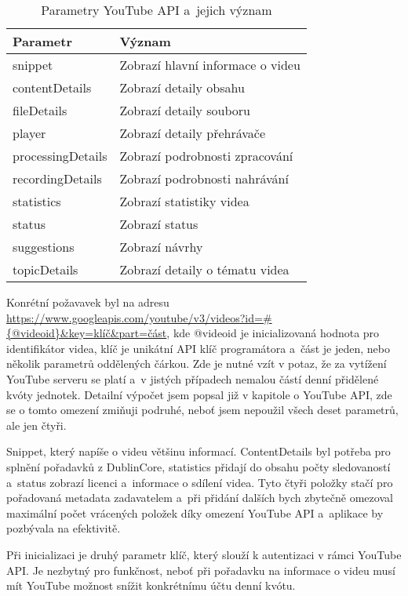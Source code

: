 \begin{table}[h!]
\centering
\begin{tabular}{| l | l |}
\hline
\textbf{Parametr} & \textbf{Význam} \\
\hline
snippet & Zobrazí hlavní informace o videu \\
\hline
contentDetails & Zobrazí detaily obsahu \\
\hline
fileDetails & Zobrazí detaily souboru \\
\hline
player & Zobrazí detaily přehrávače \\
\hline
processingDetails & Zobrazí podrobnosti zpracování \\
\hline
recordingDetails & Zobrazí podrobnosti nahrávání \\
\hline
statistics & Zobrazí statistiky videa \\
\hline
status & Zobrazí status \\
\hline
suggestions & Zobrazí návrhy \\
\hline
topicDetails & Zobrazí detaily o tématu videa \\
\hline
\end{tabular}
\caption[Parametry YouTube API a~jejich význam]{Parametry YouTube API a~jejich význam}\label{tab:apiparams}
\end{table}

\par Konrétní požavavek byl na adresu \url{https://www.googleapis.com/youtube/v3/videos?id=#{@videoid}&key=klíč&part=část}\cite{apiurl}, kde @videoid je inicializovaná hodnota pro identifikátor videa, klíč je unikátní API klíč programátora a~část je jeden, nebo několik parametrů oddělených čárkou. Zde je nutné vzít v potaz, že za vytížení YouTube serveru se platí a~v jistých případech nemalou částí denní přidělené kvóty\cite{googleconsole1} jednotek. Detailní výpočet jsem popsal již v kapitole o YouTube API, zde se o tomto omezení zmiňuji podruhé, neboť jsem nepoužil všech deset parametrů, ale jen čtyři.
\par Snippet, který napíše o videu většinu informací. ContentDetails byl potřeba pro splnění pořadavků z DublinCore, statistics přidají do obsahu počty sledovaností a~status zobrazí licenci a~informace o sdílení videa. Tyto čtyři položky stačí pro pořadovaná metadata zadavatelem a~při přidání dalších bych zbytečně omezoval maximální počet vrácených položek díky omezení YouTube API a~aplikace by pozbývala na efektivitě.
\par Při inicializaci je druhý parametr klíč, který slouží k autentizaci v rámci YouTube API. Je nezbytný pro funkčnost, neboť při pořadavku na informace o videu musí mít YouTube možnost snížit konkrétnímu účtu denní kvótu.

